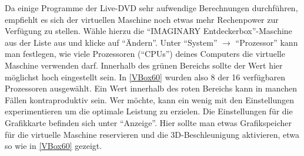 \documentclass[a4paper,10pt,BCOR=0mm,DIV=14]{scrartcl}
\newcommand{\command}[1]{\textsf{\enquote{#1}}}
\begin{document}
Da einige Programme der Live-DVD sehr aufwendige Berechnungen durchführen, empfiehlt es sich der virtuellen Maschine noch etwas mehr Rechenpower zur Verfügung zu stellen. Wähle hierzu die \command{IMAGINARY Entdeckerbox}-Maschine aus der Liste aus und klicke auf \command{Ändern}. Unter \command{System} $\rightarrow$ \command{Prozessor} kann man festlegen, wie viele Prozessoren (\command{CPUs}) deines Computers die virtuelle Maschine verwenden darf. Innerhalb des grünen Bereichs sollte der Wert hier möglichst hoch eingestellt sein. In \cref{VBox60} wurden also 8 der 16 verfügbaren Prozessoren ausgewählt. Ein Wert innerhalb des roten Bereichs kann in manchen Fällen kontraproduktiv sein. Wer möchte, kann ein wenig mit den Einstellungen experimentieren um die optimale Leistung zu erzielen. Die Einstellungen für die Grafikkarte befinden sich unter \command{Anzeige}. Hier sollte man etwas Grafikspeicher für die virtuelle Maschine reservieren und die 3D-Beschleunigung aktivieren, etwa so wie in \cref{VBox60} gezeigt.
\end{document}
